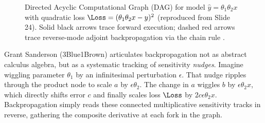 \documentclass[../../main.tex]{subfiles}
\begin{document}
\begin{figure}[htbp]
{%
}
\caption{Directed Acyclic Computational Graph (DAG) for model $\hat{y} = \theta_1 \theta_2 x$ with quadratic loss $\Loss = (\theta_1 \theta_2 x - y)^2$ (reproduced from Slide 24). Solid black arrows trace forward execution; dashed red arrows trace reverse-mode adjoint backpropagation via the chain rule \cite{rumelhart1986}.}
\label{fig:slide24_computational_graph}
\end{figure}

\begin{intuition}
Grant Sanderson (3Blue1Brown) articulates backpropagation not as abstract calculus algebra, but as a systematic tracking of sensitivity \emph{nudges}. Imagine wiggling parameter $\theta_1$ by an infinitesimal perturbation $\epsilon$. That nudge ripples through the product node to scale $a$ by $\epsilon \theta_2$. The change in $a$ wiggles $b$ by $\epsilon \theta_2 x$, which directly shifts error $c$ and finally scales loss $\Loss$ by $2c \epsilon \theta_2 x$. Backpropagation simply reads these connected multiplicative sensitivity tracks in reverse, gathering the composite derivative at each fork in the graph.
\end{intuition}
\end{document}
